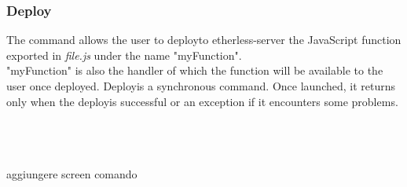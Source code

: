 \subsubsection{Deploy\glo}
The command allows the user to deploy\glo to etherless-server the JavaScript function exported in \textit{file.js} under the name "myFunction".\\ 
"myFunction" is also the handler of which the function will be available to the user once deployed. Deploy\glo is a synchronous command. Once launched, it returns only when the deploy\glo is successful or an exception if it encounters some problems.\\
\\
\centerline{}\\
\\
aggiungere screen comando





